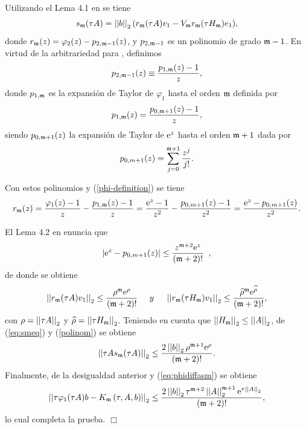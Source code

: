 Utilizando el Lema 4.1 en \cite{Saad92} se tiene
\begin{equation}
s_{\mathfrak{m}}(\tau A)=\left\lvert \left\lvert b \right\rvert \right\rvert_2 ( r_{\mathfrak{m}}(\tau A)v_1-V_{\mathfrak{m}} r_{\mathfrak{m}}(\tau H_{\mathfrak{m}})e_1) ,\label{eq:smeq}
\end{equation}
donde $r_{\mathfrak{m}}(z) = \varphi_{2}(z)-p_{2,\mathfrak{m}-1}(z)$, y $p_{2,\mathfrak{m}-1}$ es un polinomio de grado $\mathfrak{m}-1$. En virtud de la arbitrariedad para , definimos
\begin{equation*}
p_{2,\mathfrak{m}-1}(z)\equiv \frac{p_{1,\mathfrak{m}}(z)-1}{z},
\end{equation*}
donde $p_{1,\mathfrak{m}}$ es la expansión de Taylor de $\varphi_1$ hasta el orden  $\mathfrak{m}$
definida por
\[ p_{1,\mathfrak{m}}(z)= \frac{p_{0,\mathfrak{m}+1}(z)-1}{z}, \]
siendo $p_{0,\mathfrak{m}+1}(z)$ la expansión de Taylor de $\mathrm{e}^{z}$ hasta el orden $\mathfrak{m}+1$ dada por
\[ p_{0,m+1}(z)=\sum\limits^{\mathfrak{m}+1}_{j=0}\frac{z^j}{j!}. \]

Con estos polinomios y (\ref{phi-definition}) se tiene
\begin{equation*}
r_{\mathfrak{m}}(z) = \frac{\varphi_1(z)-1}{z}-\frac{p_{1,\mathfrak{m}}(z)-1}{z}=\frac{\mathrm{e}^{z}-1}{z^2}-\frac{p_{0,m+1}(z)-1}{z^2}
=\frac{\mathrm{e}^{z}-p_{0,m+1}(z)}{z^2}.
\end{equation*}

El Lema 4.2 en \cite{Saad92} enuncia que
\[ \left\lvert \mathrm{e}^{z}-p_{0,m+1}(z) \right\rvert \leq \frac{z^{\mathfrak{m}+2}\mathrm{e}^{z}}{(\mathfrak{m}+2)!}\;\;, \]
de donde se obtiene
\begin{equation}
\left\lvert \left\lvert r_{\mathfrak{m}}(\tau A)v_1 \right\rvert \right\rvert_2\leq \frac{\rho^{\mathfrak{m}}\mathrm{e}^{\rho}}{(\mathfrak{m}+2)!}\;\;\;\;\; y \;\;\;\;\; \left\lvert \left\lvert r_{\mathfrak{m}}(\tau H_{\mathfrak{m}})v_1 \right\rvert \right\rvert_2\leq \frac{\widehat{\rho}^{\mathfrak{m}}\mathrm{e}^{\widehat{\rho}}}{(\mathfrak{m}+2)!}, \label{polinom}
\end{equation}
con $\rho=\left\lvert \left\lvert \tau A \right\rvert \right\rvert_2 $ y  $\widehat{\rho}=\left\lvert \left\lvert \tau H_{\mathfrak{m}} \right\rvert \right\rvert_2$. Teniendo en cuenta que $\left\lvert \left\lvert H_{\mathfrak{m}} \right\rvert \right\rvert_2\leq\left\lvert \left\lvert A \right\rvert \right\rvert_2$, de (\ref{eq:smeq}) y (\ref{polinom}) se obtiene
\begin{equation*}
\left\lvert \left\lvert \tau As_{\mathfrak{m}}(\tau A) \right\rvert \right\rvert_2  \leq \frac{2 \left\lvert \left\lvert b \right\rvert \right\rvert_2\rho^{\mathfrak{m}+1}\mathrm{e}^{\rho}}{(\mathfrak{m}+2)!}.
\end{equation*}
Finalmente, de la desigualdad anterior y (\ref{eq:phidiffasm}) se obtiene
\begin{equation*}
\left\lvert \left\lvert \tau\varphi_1(\tau A)b - K_{\mathfrak{m}}\left(\tau,A , b \right) \right\rvert \right\rvert_2  \leq
\frac{2 \left\lvert \left\lvert b \right\rvert \right\rvert_2\tau^{\mathfrak{m}+2}\left\lvert \left\lvert A \right\rvert \right\rvert_2^{\mathfrak{m}+1}\mathrm{e}^{\tau \left\lvert \left\lvert A \right\rvert \right\rvert_2}}{(\mathfrak{m}+2)!},
\end{equation*}
lo cual completa la prueba. $\Box$

